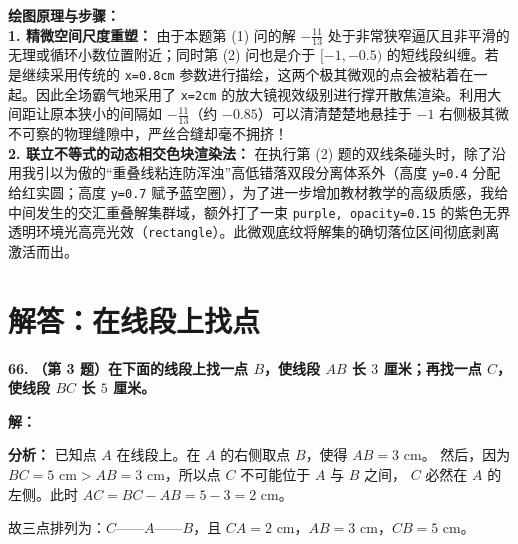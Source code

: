 \documentclass[12pt, a4paper]{ctexrep}
\begin{document}
\vspace{0.4cm}
{\small\color{blue!70!black}
\textbf{绘图原理与步骤：}\\
\textbf{1. 精微空间尺度重塑：} 由于本题第 (1) 问的解 $-\frac{11}{13}$ 处于非常狭窄逼仄且非平滑的无理或循环小数位置附近；同时第 (2) 问也是介于 $[-1, -0.5)$ 的短线段纠缠。若是继续采用传统的 \texttt{x=0.8cm} 参数进行描绘，这两个极其微观的点会被粘着在一起。因此全场霸气地采用了 \texttt{x=2cm} 的放大镜视效级别进行撑开散焦渲染。利用大间距让原本狭小的间隔如 $-\frac{11}{13}$（约 $-0.85$）可以清清楚楚地悬挂于 $-1$ 右侧极其微不可察的物理缝隙中，严丝合缝却毫不拥挤！\\
\textbf{2. 联立不等式的动态相交色块渲染法：} 在执行第 (2) 题的双线条碰头时，除了沿用我引以为傲的“重叠线粘连防浑浊”高低错落双段分离体系外（高度 \texttt{y=0.4} 分配给红实圆；高度 \texttt{y=0.7} 赋予蓝空圈），为了进一步增加教材教学的高级质感，我给中间发生的交汇重叠解集群域，额外打了一束 \texttt{purple, opacity=0.15} 的紫色无界透明环境光高亮光效（\texttt{rectangle}）。此微观底纹将解集的确切落位区间彻底剥离激活而出。
}

\newpage

\section{解答：在线段上找点}

\vspace{0.6cm}

\textbf{\LARGE 66.} \textbf{（第 3 题）在下面的线段上找一点 $B$，使线段 $AB$ 长 $3$ 厘米；再找一点 $C$，使线段 $BC$ 长 $5$ 厘米。}

\vspace{0.4cm}
\textbf{解：}

\vspace{0.2cm}
\textbf{分析：} 已知点 $A$ 在线段上。在 $A$ 的右侧取点 $B$，使得 $AB = 3\text{ cm}$。
然后，因为 $BC = 5\text{ cm} > AB = 3\text{ cm}$，所以点 $C$ 不可能位于 $A$ 与 $B$ 之间，
$C$ 必然在 $A$ 的左侧。此时 $AC = BC - AB = 5 - 3 = 2\text{ cm}$。

故三点排列为：$C$——$A$——$B$，且 $CA = 2\text{ cm}$，$AB = 3\text{ cm}$，$CB = 5\text{ cm}$。

\vspace{0.4cm}

\begin{center}
\end{center}
\end{document}
